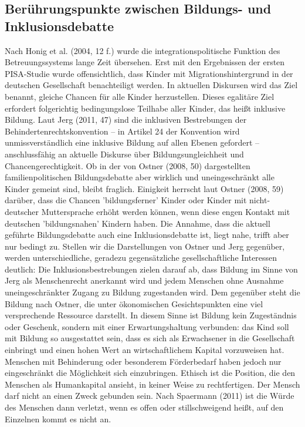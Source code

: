 \subsection{Berührungspunkte zwischen Bildungs- und Inklusionsdebatte}

Nach Honig et al. (2004, 12 f.) wurde die integrationspolitische Funktion des Betreuungssystems lange Zeit übersehen. Erst mit den Ergebnissen der ersten PISA-Studie wurde offensichtlich, dass Kinder mit Migrationshintergrund in der deutschen Gesellschaft benachteiligt werden. In aktuellen Diskursen wird das Ziel benannt, gleiche Chancen für alle Kinder herzustellen. Dieses egalitäre Ziel erfordert folgerichtig bedingungslose Teilhabe aller Kinder, das heißt inklusive Bildung. Laut Jerg (2011, 47) sind die inklusiven Bestrebungen der Behindertenrechtskonvention – in Artikel 24 der Konvention wird unmissverständlich eine inklusive Bildung auf allen Ebenen gefordert – anschlussfähig an aktuelle Diskurse über Bildungsungleichheit und Chancengerechtigkeit. Ob in der von Ostner (2008, 50) dargestellten familienpolitischen Bildungsdebatte aber wirklich und uneingeschränkt alle Kinder gemeint sind, bleibt fraglich. Einigkeit herrscht laut Ostner (2008, 59) darüber, dass die Chancen 'bildungsferner' Kinder oder Kinder mit nicht-deutscher Muttersprache erhöht werden können, wenn diese engen Kontakt mit deutschen 'bildungsnahen' Kindern haben. Die Annahme, dass die aktuell geführte Bildungsdebatte auch eine Inklusionsdebatte ist, liegt nahe, trifft aber nur bedingt zu. Stellen wir die Darstellungen von Ostner und Jerg gegenüber, werden unterschiedliche, geradezu gegensätzliche gesellschaftliche Interessen deutlich: Die Inklusionsbestrebungen zielen darauf ab, dass Bildung im Sinne von Jerg als Menschenrecht anerkannt wird und jedem Menschen ohne Ausnahme uneingeschränkter Zugang zu Bildung zugestanden wird. Dem gegenüber steht die Bildung nach Ostner, die unter ökonomischen Gesichtspunkten eine viel versprechende Ressource darstellt. In diesem Sinne ist Bildung kein Zugeständnis oder Geschenk, sondern mit einer Erwartungshaltung verbunden: das Kind soll mit Bildung so ausgestattet sein, dass es sich als Erwachsener in die Gesellschaft einbringt und einen hohen Wert an wirtschaftlichem Kapital vorzuweisen hat. Menschen mit Behinderung oder besonderem Förderbedarf haben jedoch nur eingeschränkt die Möglichkeit sich einzubringen. Ethisch ist die Position, die den Menschen als Humankapital ansieht, in keiner Weise zu rechtfertigen. Der Mensch darf nicht an einen Zweck gebunden sein. Nach Spaermann (2011) ist die Würde des Menschen dann verletzt, wenn es offen oder stillschweigend heißt, auf den Einzelnen kommt es nicht an. 

